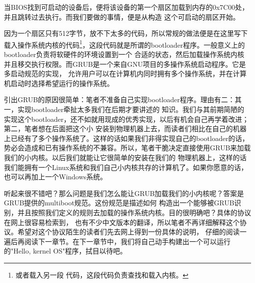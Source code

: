 \par 当BIOS找到可启动的设备后，便将该设备的第一个扇区加载到内存的0x7C00处，并且跳转过去执行。而我们要做的事情，便是从构造\allowbreak
这个可启动的扇区开始。

\par 因为一个扇区只有512字节，放不下太多的代码，所以常规的做法便是在这里写下载入操作系统内核的代码\footnote{或者载入另一段\allowbreak
代码，这段代码负责查找和载入内核。}，这段代码就是所谓的bootloader程序。一般意义上的bootloader负责将软硬件的环境设置到一个\allowbreak
合适的状态，然后加载操作系统内核并且移交执行权限。而GRUB是一个来自GNU项目的多操作系统启动程序。它是多启动规范的实现，\allowbreak
允许用户可以在计算机内同时拥有多个操作系统，并在计算机启动时选择希望运行的操作系统。

\par 引出GRUB的原因很简单：笔者不准备自己实现bootloader程序。理由有二：其一，实现bootloader牵扯太多我们在后期才要讲述的\allowbreak
知识。我们与其前期简陋的实现这个bootloader，还不如就用现成的优秀实现，以后有机会自己再学着改进；第二，笔者想在后面把这个小\allowbreak
安装到物理机器上去，而读者们相比在自己的机器上已经有了多个操作系统了。这样的话如果我们非得实现自己的bootloader的话，\allowbreak
势必会造成和已有操作系统的不兼容。所以，笔者干脆决定直接使用GRUB来加载我们的小内核。以后我们就能让它很简单的安装在我们的\allowbreak
物理机器上，这样的话我们能拥有一个Linux系统和我们自己小内核共存的计算机了。如果你愿意的话，也可以再加上一个Windows系统。

\par 听起来很不错吧？那么问题是我们怎么能让GRUB加载我们的小内核呢？答案是GRUB提供的multiboot规范。这份规范是描述如何\allowbreak
构造出一个能够被GRUB识别，并且按照我们定义的规则去加载的操作系统内核。目的很明确吧？具体的协议在网上很容易检索到，\allowbreak
也有不少中文版本的翻译，所以笔者不再详细解释这个协议。希望对这个协议陌生的读者们先去网上得到一份具体的说明，\allowbreak
仔细的阅读一遍后再阅读下一章节。在下一章节中，我们将自己动手构建出一个可以运行的"Hello, kernel OS"程序，拭目以待吧。


